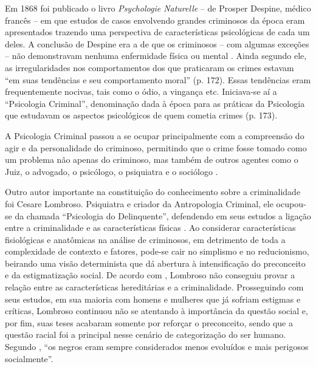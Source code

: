 
Em 1868 foi publicado o livro \emph{Psychologie Naturelle} -- de Prosper Despine, médico francês -- em que estudos de casos envolvendo grandes criminosos da época eram apresentados trazendo uma perspectiva de características psicológicas de cada um deles. A conclusão de Despine era a de que os criminosos -- com algumas exceções -- não demonstravam nenhuma enfermidade física ou mental \cite{LEAL2008}. Ainda segundo ele, as irregularidades nos comportamentos dos que praticaram os crimes estavam ``em suas tendências e seu comportamento moral'' (p. 172). Essas tendências eram frequentemente nocivas, tais como o ódio, a vingança etc. Iniciava-se aí a ``Psicologia Criminal'', denominação dada à época para as práticas da Psicologia que estudavam os aspectos psicológicos de quem cometia crimes (p. 173). 

A Psicologia Criminal passou a se ocupar principalmente com a compreensão do agir e da personalidade do criminoso, permitindo que o crime fosse tomado como um problema não apenas do criminoso, mas também de outros agentes como o Juiz, o advogado, o psicólogo, o psiquiatra e o sociólogo .

Outro autor importante na constituição do conhecimento sobre a criminalidade foi Cesare Lombroso. Psiquiatra e criador da Antropologia Criminal, ele ocupou-se da chamada ``Psicologia do Delinquente'', defendendo em seus estudos a ligação entre a criminalidade e as características físicas \cite{JESUS2001}. Ao considerar características fisiológicas e anatômicas na análise de criminosos, em detrimento de toda a complexidade de contexto e fatores, pode-se cair no simplismo e no reducionismo, beirando uma visão determinista que dá abertura à intensificação do preconceito e da estigmatização social. De acordo com , Lombroso não conseguiu provar a relação entre as características hereditárias e a criminalidade. Prosseguindo com seus estudos, em sua maioria com homens e mulheres que já sofriam estigmas e críticas, Lombroso continuou não se atentando à importância da questão social e, por fim, suas teses acabaram somente por reforçar o preconceito, sendo que a questão racial foi a principal nesse cenário de categorização do ser humano. Segundo , ``os negros eram sempre considerados menos evoluídos e mais perigosos socialmente''.

